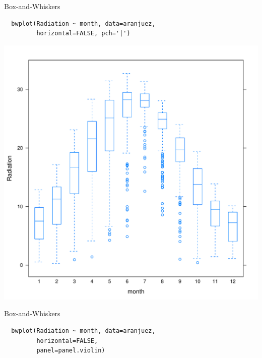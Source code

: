 \documentclass[xcolor={usenames,svgnames,dvipsnames}]{beamer}
\begin{document}
\begin{frame}[fragile,label=sec-2-1-40]{Box-and-Whiskers}
 \lstset{language=R,label= ,caption= ,numbers=none}
\begin{lstlisting}
  bwplot(Radiation ~ month, data=aranjuez,
         horizontal=FALSE, pch='|')
\end{lstlisting}
\end{frame}

\begin{frame}[label=sec-2-1-41]{}
\includegraphics[width=.9\linewidth]{figs/bwplot.pdf}
\end{frame}

\begin{frame}[fragile,label=sec-2-1-42]{Box-and-Whiskers}
 \lstset{language=R,label= ,caption= ,numbers=none}
\begin{lstlisting}
  bwplot(Radiation ~ month, data=aranjuez,
         horizontal=FALSE,
         panel=panel.violin)
\end{lstlisting}
\end{frame}
\end{document}
